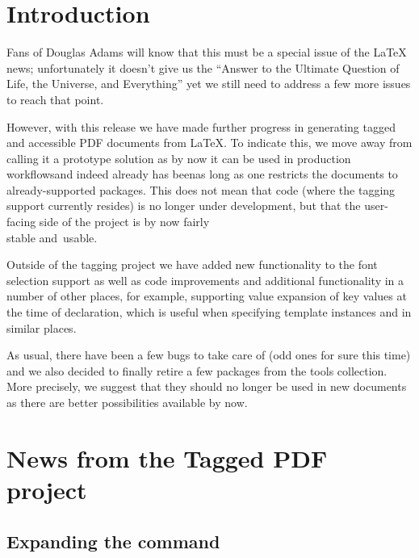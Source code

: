 \documentclass{ltnews}
\providecommand\Dash {\unskip \textemdash}
\begin{document}
\maketitle
{  \spaceskip=3.33pt 
\tableofcontents}

\pagebreak

\setlength{}

\section{Introduction}

Fans of Douglas Adams will know that this must be a special issue of the
\LaTeX{} news; unfortunately it doesn't give us the
\enquote{Answer to the Ultimate Question of Life, the Universe, and
    Everything} yet \Dash we still need to address a few more issues to reach that
point.

%
However, with this release we have made further progress in
generating tagged and accessible PDF documents from \LaTeX{}. To
indicate this, we move away from calling it a prototype solution as by
now it can be used in production workflows\Dash and indeed already has
been\Dash as long as one
restricts the documents to already-supported packages. This does not
mean that  code (where the tagging support currently
resides) is no longer under development, but that the user-facing side
of the project is by now fairly\\ stable and~usable.

Outside of the tagging project we have added new functionality to the
font selection support as well as code improvements and additional
functionality in a number of other places, for example, supporting
value expansion of key values at the time of declaration, which is
useful when specifying template instances and in similar places.

As usual, there have been a few bugs to take care of (odd ones for
sure this time) and we also decided to finally retire a few packages
from the tools collection. More precisely, we suggest that they should no
longer be used
in new documents
as there are better possibilities available by now.


\section{News from the Tagged PDF project}

\subsection{Expanding the  command}
\end{document}

